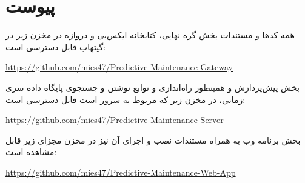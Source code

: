 \chapter*{‌پیوست}

همه کدها و مستندات بخش گره نهایی، کتابخانه ایکس‌بی و دروازه در مخزن زیر در گیتهاب قابل دسترسی است:

\begin{latin}

\url{https://github.com/mies47/Predictive-Maintenance-Gateway}

\end{latin}

بخش پیش‌پردازش و همینطور راه‌اندازی و توابع نوشتن و جستجوی پایگاه داده سری زمانی، در مخزن زیر که مربوط به سرور است قابل دسترسی است:

\begin{latin}

\url{https://github.com/mies47/Predictive-Maintenance-Server}

\end{latin}

بخش برنامه وب به همراه مستندات نصب و اجرای آن نیز در مخزن مجزای زیر قابل مشاهده است:

\begin{latin}

\url{https://github.com/mies47/Predictive-Maintenance-Web-App}

\end{latin}

